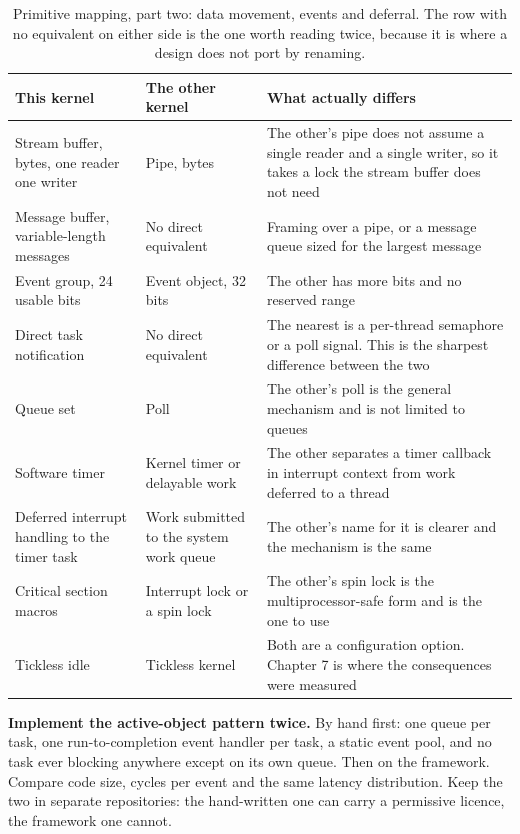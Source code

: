 \begin{steps}
\begin{table}[H]\centering\small
\begin{tabular}{p{38mm}p{38mm}p{76mm}}
\toprule
This kernel & The other kernel & What actually differs \\
\midrule
Stream buffer, bytes, one reader one writer & Pipe, bytes & The other's pipe does not assume a single reader and a single writer, so it takes a lock the stream buffer does not need \\
Message buffer, variable-length messages & No direct equivalent & Framing over a pipe, or a message queue sized for the largest message \\
Event group, 24 usable bits & Event object, 32 bits & The other has more bits and no reserved range \\
Direct task notification & No direct equivalent & The nearest is a per-thread semaphore or a poll signal. This is the sharpest difference between the two \\
Queue set & Poll & The other's poll is the general mechanism and is not limited to queues \\
Software timer & Kernel timer or delayable work & The other separates a timer callback in interrupt context from work deferred to a thread \\
Deferred interrupt handling to the timer task & Work submitted to the system work queue & The other's name for it is clearer and the mechanism is the same \\
Critical section macros & Interrupt lock or a spin lock & The other's spin lock is the multiprocessor-safe form and is the one to use \\
Tickless idle & Tickless kernel & Both are a configuration option. Chapter 7 is where the consequences were measured \\
\bottomrule
\end{tabular}
\caption{Primitive mapping, part two: data movement, events and deferral. The row with no equivalent on either side is the one worth reading twice, because it is where a design does not port by renaming.}
\end{table}

\item \textbf{Implement the active-object pattern twice.} By hand first: one
queue per task, one run-to-completion event handler per task, a static event
pool, and no task ever blocking anywhere except on its own queue. Then on the
framework. Compare code size, cycles per event and the same latency
distribution. Keep the two in separate repositories: the hand-written one can
carry a permissive licence, the framework one cannot.
\end{steps}

